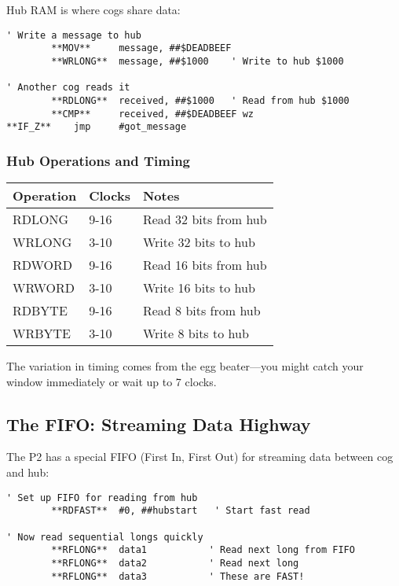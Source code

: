 \documentclass[11pt]{book}
\begin{document}
Hub RAM is where cogs share data:

\begin{lstlisting}
' Write a message to hub
        **MOV**     message, ##$DEADBEEF
        **WRLONG**  message, ##$1000    ' Write to hub $1000
        
' Another cog reads it
        **RDLONG**  received, ##$1000   ' Read from hub $1000
        **CMP**     received, ##$DEADBEEF wz
**IF_Z**    jmp     #got_message
\end{lstlisting}

\hypertarget{hub-operations-and-timing}{%
\subsubsection{Hub Operations and
Timing}\label{hub-operations-and-timing}}

\begin{longtable}[]{@{}lll@{}}
\toprule
Operation & Clocks & Notes \\
\midrule
\endhead
RDLONG & 9-16 & Read 32 bits from hub \\
WRLONG & 3-10 & Write 32 bits to hub \\
RDWORD & 9-16 & Read 16 bits from hub \\
WRWORD & 3-10 & Write 16 bits to hub \\
RDBYTE & 9-16 & Read 8 bits from hub \\
WRBYTE & 3-10 & Write 8 bits to hub \\
\bottomrule
\end{longtable}

The variation in timing comes from the egg beater---you might catch your
window immediately or wait up to 7 clocks.

\hypertarget{the-fifo-streaming-data-highway}{%
\subsection{The FIFO: Streaming Data
Highway}\label{the-fifo-streaming-data-highway}}

The P2 has a special FIFO (First In, First Out) for streaming data
between cog and hub:

\begin{lstlisting}
' Set up FIFO for reading from hub
        **RDFAST**  #0, ##hubstart   ' Start fast read
        
' Now read sequential longs quickly
        **RFLONG**  data1           ' Read next long from FIFO
        **RFLONG**  data2           ' Read next long
        **RFLONG**  data3           ' These are FAST!
\end{lstlisting}
\end{document}
